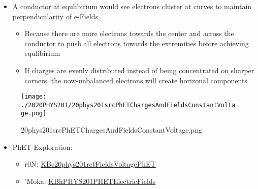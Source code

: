\documentclass[letterpaper]{article}
\begin{document}
\begin{itemize}
\item A conductor at equlibirium would see electrons cluster at curves to
maintain perpendicularity of e-Fields

\begin{itemize}
\item Because there are more electrons towards the center and across the
conductor to push all electrons towards the extremities before
achieving equlibirium
\item If charges are evenly distributed instead of being concentrated on
sharper corners, the now-unbalanced electrons will create horizonal
components
\end{itemize}
\end{itemize}

\begin{figure}[htbp]
\centering
\texttt{[image: ./2020PHYS201/20phys201srcPhETChargesAndFieldsConstantVoltage.png]}
\caption{20phys201srcPhETChargesAndFieldsConstantVoltage.png}
\end{figure}

\begin{itemize}
\item PhET Exploration:

\begin{itemize}
\item r0N:
\href{KBe20phys201retFieldsVoltagePhET.org}{KBe20phys201retFieldsVoltagePhET}
\item 'Moka:
\href{KBhPHYS201PHETElectricFields.org}{KBhPHYS201PHETElectricFields}
\end{itemize}
\end{itemize}
\end{document}
